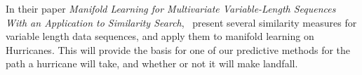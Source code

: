 
In their paper \textit{Manifold Learning for Multivariate Variable-Length Sequences With an Application to Similarity Search},~\cite{ho2015manifold} present several similarity measures for variable length data sequences, and apply them to manifold learning on Hurricanes.
This will provide the basis for one of our predictive methods for the path a hurricane will take, and whether or not it will make landfall.